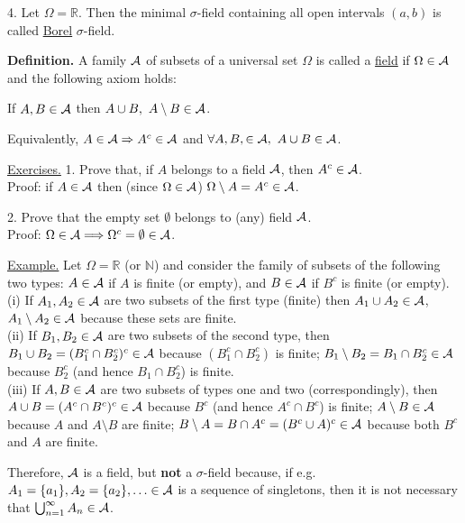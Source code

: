 \documentclass[a4paper,10pt]{article}
\def\NN{\mathbb{N}}
\def\RR{\mathbb{R}}
\newcommand{\1}[1]{\mathbf{1}_{\{#1\}}}
\begin{document}
4. Let $\Omega=\RR$. Then the minimal $\sigma$-field containing all open intervals $(a,b)$ is called \underline{Borel} $\sigma$-field. \vspace{3mm}

{\bf Definition.} A family $\cal A$ of subsets of a universal set $\Omega$ is called a \underline{field} if $\Omega\in{\cal A}$ and the following axiom holds:

If $A,B\in{\cal A}$ then $A\cup B,~A\setminus B\in{\cal A}$.

Equivalently, $A\in{\cal A}\Rightarrow A^c\in{\cal A}$ and $\forall A,B,\in{\cal A},~A\cup B\in{\cal A}$.\vspace{3mm}

\underline{Exercises.} 1. Prove that, if $A$ belongs to a field $\cal A$, then $A^c\in{\cal A}$.\\
Proof: if $A\in{\cal A}$ then (since $\Omega\in{\cal A}$) $\Omega\setminus A=A^c\in{\cal A}$. \blacksquare

2. Prove that the empty set $\emptyset$ belongs to (any) field $\cal A$.\\
Proof: $\Omega\in{\cal A}\Longrightarrow \Omega^c=\emptyset\in{\cal A}$. \blacksquare\vspace{3mm}

\underline{Example.} Let $\Omega=\RR$ (or $\NN$) and consider the family of subsets of the following two types: $A\in{\cal A}$ if $A$ is finite (or empty), and $B\in{\cal A}$ if $B^c$ is finite (or empty).\\
(i) If $A_1,A_2\in{\cal A}$ are two subsets of the first type (finite) then $A_1\cup A_2\in{\cal A}$, $A_1\setminus A_2\in{\cal A}$ because these sets are finite.\\
(ii) If $B_1,B_2\in{\cal A}$ are two subsets of the second type, then $B_1\cup B_2=(B_1^c\cap B_2^c)^c\in{\cal A}$ because $(B_1^c\cap B_2^c)$ is finite;
$B_1\setminus B_2=B_1\cap B_2^c\in{\cal A}$ because $B_2^c$ (and hence $B_1\cap B_2^c$) is finite. \\
(iii) If $A,B\in{\cal A}$ are two subsets of types one and two (correspondingly), then $A\cup B=(A^c\cap B^c)^c\in{\cal A}$ because $B^c$ (and hence $A^c\cap B^c$) is finite; $A\setminus B\in{\cal A}$ because $A$ and $A\setminus B$ are finite; $B\setminus A=B\cap A^c=(B^c\cup A)^c\in{\cal A}$ because both $B^c$ and $A$ are finite.

Therefore, $\cal A$ is a field, but {\bf not} a $\sigma$-field because, if e.g. $A_1=\{a_1\},A_2=\{a_2\},\ldots\in{\cal A}$ is a sequence of singletons, then it is not necessary that $\bigcup_{n=1}^\infty A_n\in{\cal A}$.\vspace{3mm}
\end{document}
